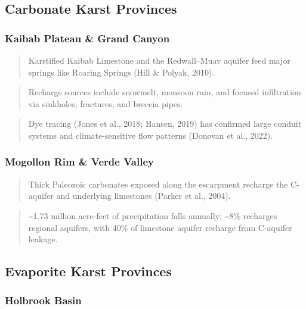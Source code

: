 \documentclass[
]{agujournal2019}
\begin{document}
\subsection{Carbonate Karst Provinces}\label{carbonate-karst-provinces}

\subsubsection{Kaibab Plateau \& Grand
Canyon}\label{kaibab-plateau-grand-canyon}

\begin{quote}
Karstified Kaibab Limestone and the Redwall--Muav aquifer feed major
springs like Roaring Springs (Hill \& Polyak, 2010).
\end{quote}

\begin{quote}
Recharge sources include snowmelt, monsoon rain, and focused
infiltration via sinkholes, fractures, and breccia pipes.
\end{quote}

\begin{quote}
Dye tracing (Jones et al., 2018; Hansen, 2019) has confirmed large
conduit systems and climate-sensitive flow patterns (Donovan et al.,
2022).
\end{quote}

\subsubsection{Mogollon Rim \& Verde
Valley}\label{mogollon-rim-verde-valley}

\begin{quote}
Thick Paleozoic carbonates exposed along the escarpment recharge the
C-aquifer and underlying limestones (Parker et al., 2004).
\end{quote}

\begin{quote}
\textasciitilde1.73 million acre-feet of precipitation falls annually;
\textasciitilde8\% recharges regional aquifers, with 40\% of limestone
aquifer recharge from C-aquifer leakage.
\end{quote}

\subsection{Evaporite Karst Provinces}\label{evaporite-karst-provinces}

\subsubsection{Holbrook Basin}\label{holbrook-basin}
\end{document}
